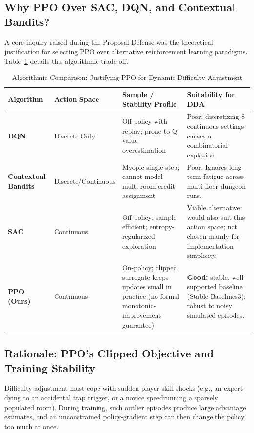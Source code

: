 \subsection{Why PPO Over SAC, DQN, and Contextual Bandits?}
A core inquiry raised during the Proposal Defense was the theoretical justification for selecting PPO over alternative reinforcement learning paradigms. Table~\ref{tab:rl_comparison} details this algorithmic trade-off.

\begin{table}[!htbp]
\centering
\caption{Algorithmic Comparison: Justifying PPO for Dynamic Difficulty Adjustment}
\label{tab:rl_comparison}
\small
\begin{tabular}{p{}p{}p{}p{}}
\toprule
\textbf{Algorithm} & \textbf{Action Space} & \textbf{Sample / Stability Profile} & \textbf{Suitability for DDA} \\
\midrule
\textbf{DQN}~\cite{mnih2015human} & Discrete Only & Off-policy with replay; prone to Q-value overestimation & Poor: discretizing 8 continuous settings causes a combinatorial explosion. \\
\textbf{Contextual Bandits} & Discrete/Continuous & Myopic single-step; cannot model multi-room credit assignment & Poor: Ignores long-term fatigue across multi-floor dungeon runs. \\
\textbf{SAC}~\cite{haarnoja2018soft} & Continuous & Off-policy; sample efficient; entropy-regularized exploration & Viable alternative: would also suit this action space; not chosen mainly for implementation simplicity. \\
\textbf{PPO (Ours)}~\cite{schulman2017proximal} & Continuous & On-policy; clipped surrogate keeps updates small in practice (no formal monotonic-improvement guarantee) & \textbf{Good:} stable, well-supported baseline (Stable-Baselines3); robust to noisy simulated episodes. \\
\bottomrule
\end{tabular}
\end{table}

\subsection{Rationale: PPO's Clipped Objective and Training Stability}\label{sec:ppo_proof}
Difficulty adjustment must cope with sudden player skill shocks (e.g., an expert dying to an accidental trap trigger, or a novice speedrunning a sparsely populated room). During training, such outlier episodes produce large advantage estimates, and an unconstrained policy-gradient step can then change the policy too much at once.


